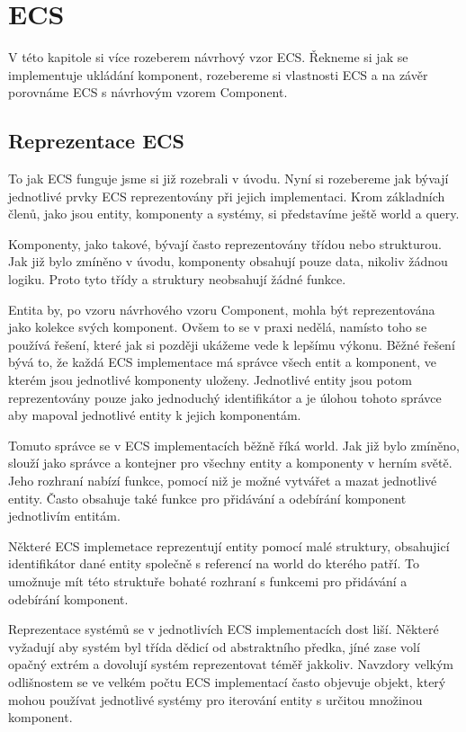\chapter{ECS}
\label{chap:ecs}
V této kapitole si více rozeberem návrhový vzor ECS. Řekneme si jak se implementuje ukládání komponent, rozebereme si vlastnosti ECS a na závěr porovnáme ECS s návrhovým vzorem Component.

\section{Reprezentace ECS}
To jak ECS funguje jsme si již rozebrali v úvodu. Nyní si rozebereme jak bývají jednotlivé prvky ECS reprezentovány při jejich implementaci. Krom základních členů, jako jsou entity, komponenty a systémy, si představíme ještě world a query.

Komponenty, jako takové, bývají často reprezentovány třídou nebo strukturou. Jak již bylo zmíněno v úvodu, komponenty obsahují pouze data, nikoliv žádnou logiku. Proto tyto třídy a struktury neobsahují žádné funkce.

Entita by, po vzoru návrhového vzoru Component, mohla být reprezentována jako kolekce svých komponent. Ovšem to se v praxi nedělá, namísto toho se používá řešení, které jak si později ukážeme vede k lepšímu výkonu. Běžné řešení bývá to, že každá ECS implementace má správce všech entit a komponent, ve kterém jsou jednotlivé komponenty uloženy. Jednotlivé entity jsou potom reprezentovány pouze jako jednoduchý identifikátor a je úlohou tohoto správce aby mapoval jednotlivé entity k jejich komponentám.

Tomuto správce se v ECS implementacích běžně říká world. Jak již bylo zmíněno, slouží jako správce a kontejner pro všechny entity a komponenty v herním světě. Jeho rozhraní nabízí funkce, pomocí niž je možné vytvářet a mazat jednotlivé entity. Často obsahuje také funkce pro přidávání a odebírání komponent jednotlivím entitám.

Některé ECS implemetace reprezentují entity pomocí malé struktury, obsahujicí identifikátor dané entity společně s referencí na world do kterého patří. To umožnuje mít této struktuře bohaté rozhraní s funkcemi pro přidávání a odebírání komponent.

Reprezentace systémů se v jednotlivích ECS implementacích dost liší. Některé vyžadují aby systém byl třída dědicí od abstraktního předka, jíné zase volí opačný extrém a dovolují systém reprezentovat téměř jakkoliv. Navzdory velkým odlišnostem se ve velkém počtu ECS implementací často objevuje objekt, který mohou používat jednotlivé systémy pro iterování entity s určitou množinou komponent.


